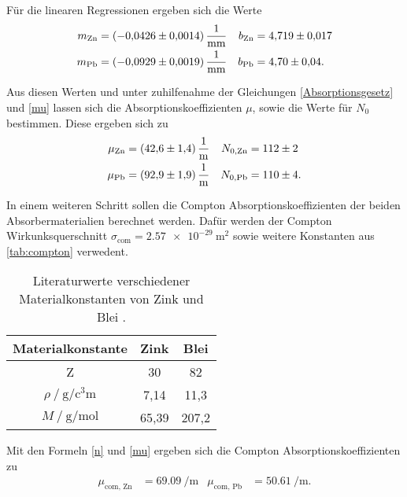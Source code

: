   Für die linearen Regressionen ergeben sich die Werte
  \begin{align*}
      m_{\text{Zn}} & = \qty{-0.0426+-0.0014}{\per\milli\metre} & b_{\text{Zn}} &= \num{4.719+-0.017} \\
      m_{\text{Pb}} & = \qty{-0.0929+-0.0019}{\per\milli\metre} & b_{\text{Pb}} &= \num{4.70+-0.04}. \\
  \end{align*}

  Aus diesen Werten und unter zuhilfenahme der Gleichungen \eqref{Absorptionsgesetz} und \eqref{mu} lassen sich die
  Absorptionskoeffizienten $\mu$, sowie die Werte für $N_0$ bestimmen. Diese ergeben sich zu
  \begin{align*}
    \mu_{\text{Zn}} & = \qty{42.6+-1.4}{\per\metre} & N_{0,\text{Zn}} &= \num{112+-2} \\
    \mu_{\text{Pb}} & = \qty{92.9+-1.9}{\per\metre} & N_{0,\text{Pb}} &= \num{110+-4}. \\
  \end{align*}

  In einem weiteren Schritt sollen die Compton Absorptionskoeffizienten der beiden Absorbermaterialien berechnet werden.
  Dafür werden der Compton Wirkunksquerschnitt $\sigma_{\text{com}} = \qty{2.57e-29}{\metre\squared}$ sowie weitere 
  Konstanten aus \autoref{tab:compton} verwedent. 
  
\begin{table} [H]
    \centering
    \caption{Literaturwerte verschiedener Materialkonstanten von Zink und Blei \cite{Gestis}.}
    \label{tab:compton}
    \begin{tabular}{S S S}
      \toprule
      {Materialkonstante} & {Zink} & {Blei}  \\
      \midrule
      {Z}     & 30 & 82 \\
      $\rho \mathbin{/} \unit{\gram\per\cubic\centi\metre}$ & 7,14 & 11,3 \\
      $M \mathbin{/} \unit{\gram\per\mol}$ & 65,39 & 207,2 \\
      \bottomrule
    \end{tabular}
\end{table}

Mit den Formeln \eqref{n} und \eqref{mu} ergeben sich die Compton Absorptionskoeffizienten zu
\begin{align*}
    \mu_{\text{com, Zn}} &= \qty{69,09}{\per\metre} & \mu_{\text{com, Pb}} &= \qty{50,61}{\per\metre}.
\end{align*}